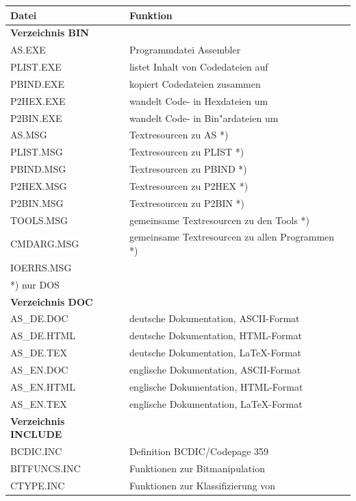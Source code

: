 \documentclass[12pt,a4paper,twoside]{report}
\newcommand{\asname}{AS}
\begin{document}
\begin{center}\begin{longtable}{|l|l|}
\hline
Datei             & Funktion \\
\hline
\hline
\endhead
{\bf Verzeichnis BIN} & \\
\hline
AS.EXE            & Programmdatei Assembler \\
PLIST.EXE         & listet Inhalt von Codedateien auf \\
PBIND.EXE         & kopiert Codedateien zusammen \\
P2HEX.EXE         & wandelt Code- in Hexdateien um \\
P2BIN.EXE         & wandelt Code- in Bin"ardateien um \\
AS.MSG            & Textresourcen zu \asname{} *) \\
PLIST.MSG         & Textresourcen zu PLIST *) \\
PBIND.MSG         & Textresourcen zu PBIND *) \\
P2HEX.MSG         & Textresourcen zu P2HEX *) \\
P2BIN.MSG         & Textresourcen zu P2BIN *) \\
TOOLS.MSG         & gemeinsame Textresourcen zu den Tools *) \\
CMDARG.MSG        & gemeinsame Textresourcen zu allen Programmen *) \\
IOERRS.MSG        & \\
\hline
\multicolumn{2}{|l|}{*) nur DOS} \\
\hline
{\bf Verzeichnis DOC} & \\
\hline
AS\_DE.DOC        & deutsche Dokumentation, ASCII-Format \\
AS\_DE.HTML       & deutsche Dokumentation, HTML-Format \\
AS\_DE.TEX        & deutsche Dokumentation, LaTeX-Format \\
AS\_EN.DOC        & englische Dokumentation, ASCII-Format \\
AS\_EN.HTML       & englische Dokumentation, HTML-Format \\
AS\_EN.TEX        & englische Dokumentation, LaTeX-Format \\
\hline
{\bf Verzeichnis INCLUDE} & \\
\hline
BCDIC.INC         & Definition BCDIC/Codepage 359 \\
BITFUNCS.INC      & Funktionen zur Bitmanipulation \\
CTYPE.INC         & Funktionen zur Klassifizierung von \\

\end{longtable}
\end{center}
\end{document}
